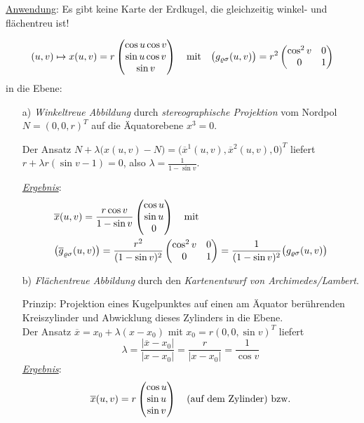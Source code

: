 \uline{Anwendung}: Es gibt keine Karte der Erdkugel, die gleichzeitig winkel- und flächentreu ist!

\begin{bsp}
 \[
  (u,v) \mapsto x(u,v) = r \begin{pmatrix} \cos u \cos v \\ \sin u \cos v \\ \sin v \end{pmatrix}  \quad \text{mit} \quad \big(g_{\varrho \sigma} (u,v)\big) = r^2 \begin{pmatrix}
   \cos^2 v & 0 \\
   0 & 1
  \end{pmatrix}
 \]
 in die Ebene:
 \begin{enumerate}
  \item[a)]
  \textit{Winkeltreue Abbildung} durch \textit{stereographische Projektion} vom Nordpol \(N = (0,0,r)^T\) auf die Äquatorebene \(x^3 = 0\). \par
  Der Ansatz \(N + \lambda \big(x(u,v) - N\big) = \big(\overline x^1(u,v), \overline x^2(u,v), 0\big)^T\) liefert \(r + \lambda r(\sin v-1) = 0\), also \(\lambda = \frac1{1-\sin v}\).\par
  \uline{\textit{Ergebnis}}:
  \begin{align*}
   &\overline x(u,v) = \frac{r\cos v}{1-\sin v} \begin{pmatrix} \cos u \\ \sin u \\ 0 \end{pmatrix}  \quad \text{mit} \\
   &\big( \overline g_{\varrho \sigma}(u,v)\big) = \frac{r^2}{(1-\sin v)^2} \begin{pmatrix}
                                                                             \cos^2 v & 0 \\
                                                                             0 & 1
                                                                            \end{pmatrix}
   = \frac{1}{(1-\sin v)^2} \big(g_{\varrho \sigma}(u,v)\big)
  \end{align*}
  \item[b)] \textit{Flächentreue Abbildung} durch den \textit{Kartenentwurf von Archimedes/Lambert}. \par
  Prinzip: Projektion eines Kugelpunktes auf einen am Äquator berührenden Kreiszylinder und Abwicklung dieses Zylinders in die Ebene.\\
  Der Ansatz \(\overline x = x_0 + \lambda (x-x_0)\) mit \(x_0 = r (0,0, \sin v)^T\) liefert
  \[
   \lambda = \frac{|\overline x - x_0|}{|x-x_0|} = \frac{r}{|x-x_0|} = \frac{1}{\cos v}
  \]
  \uline{\textit{Ergebnis}}:
  \begin{align*}
   \overline{x}(u,v) &= r \vxyz{\cos u}{\sin u}{\sin v} \quad \text{(auf dem Zylinder) bzw.} \\

\end{align*}
\end{enumerate}
\end{bsp}

